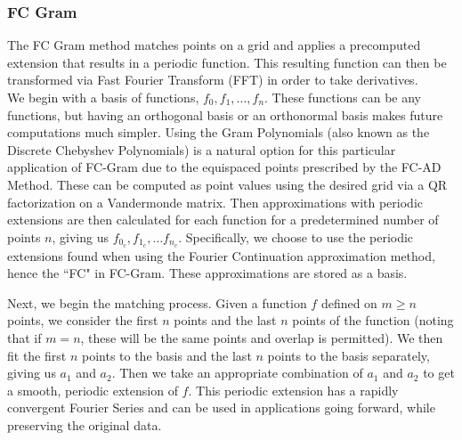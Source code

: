 \documentclass[11pt]{amsart}
\begin{document}
\subsubsection{FC Gram}
The FC Gram method matches points on a grid and applies a precomputed extension that results in a periodic function.  This resulting function can then be transformed via Fast Fourier Transform (FFT) in order to take derivatives. \\
We begin with a basis of functions, $f_0,f_1,\ldots,f_n$.  These functions can be any functions, but having an orthogonal basis or an orthonormal basis makes future computations much simpler.  Using the Gram Polynomials (also known as the Discrete Chebyshev Polynomials) is a natural option for this particular application of FC-Gram due to the equispaced points prescribed by the FC-AD Method.   These can be computed as point values using the desired grid via a QR factorization on a Vandermonde matrix.   
Then approximations with periodic extensions are then calculated for each function for a predetermined number of points $n$, giving us $f_{0_c},f_{1_c},\ldots f_{n_c}$.  Specifically, we choose to use the periodic extensions found when using the Fourier Continuation approximation method, hence the ``FC" in FC-Gram.  These approximations are stored as a basis.  

Next, we begin the matching process.  Given a function $f$ defined on $m \geq n$ points, we consider the first $n$ points and the last $n$ points of the function (noting that if $m=n$, these will be the same points and overlap is permitted). We then fit the first $n$ points to the basis and the last $n$ points to the basis separately, giving us $a_1$ and $a_2$.  Then we take an appropriate combination of $a_1$ and $a_2$ to get a smooth, periodic extension of $f$.  This periodic extension has a rapidly convergent Fourier Series and can be used in applications going forward, while preserving the original data.   


 
\end{document}
